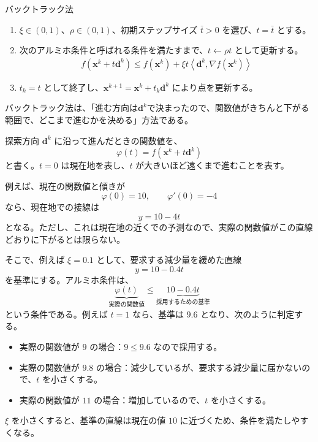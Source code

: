 \documentclass[a4j]{jarticle}
\begin{document}
\begin{itembox}[l]{バックトラック法}
  \begin{enumerate}
    \item $\xi\in(0,1)$、$\rho\in(0,1)$、初期ステップサイズ $\bar t>0$ を選び、$t=\bar t$ とする。
    \item 次のアルミホ条件と呼ばれる条件を満たすまで、$t\leftarrow\rho t$ として更新する。
    \begin{align}
      f(\bm{x}^k+t\bm{d}^k)
      \le f(\bm{x}^k)+\xi t\left\langle\bm{d}^k,\nabla f(\bm{x}^k)\right\rangle
      \label{eq:armijo}
    \end{align}
    \item $t_k=t$ として終了し、$\bm{x}^{k+1}=\bm{x}^k+t_k\bm{d}^k$ により点を更新する。
  \end{enumerate}
\end{itembox}

バックトラック法は、「進む方向は$\bm{d}^k$で決まったので、関数値がきちんと下がる範囲で、どこまで進むかを決める」方法である。

探索方向 $\bm{d}^k$ に沿って進んだときの関数値を、
\[
  \varphi(t)=f(\bm{x}^k+t\bm{d}^k)
\]
と書く。$t=0$ は現在地を表し、$t$ が大きいほど遠くまで進むことを表す。

例えば、現在の関数値と傾きが
\[
  \varphi(0)=10,\qquad\varphi'(0)=-4
\]
なら、現在地での接線は
\[
  y=10-4t
\]
となる。ただし、これは現在地の近くでの予測なので、実際の関数値がこの直線どおりに下がるとは限らない。

そこで、例えば $\xi=0.1$ として、要求する減少量を緩めた直線
\[
  y=10-0.4t
\]
を基準にする。アルミホ条件は、
\[
  \underbrace{\varphi(t)}_{\text{実際の関数値}}
  \le\underbrace{10-0.4t}_{\text{採用するための基準}}
\]
という条件である。例えば $t=1$ なら、基準は $9.6$ となり、次のように判定する。
\begin{itemize}
  \item 実際の関数値が $9$ の場合：$9\le9.6$ なので採用する。
  \item 実際の関数値が $9.8$ の場合：減少しているが、要求する減少量に届かないので、$t$ を小さくする。
  \item 実際の関数値が $11$ の場合：増加しているので、$t$ を小さくする。
\end{itemize}

$\xi$ を小さくすると、基準の直線は現在の値 $10$ に近づくため、条件を満たしやすくなる。
\end{document}
